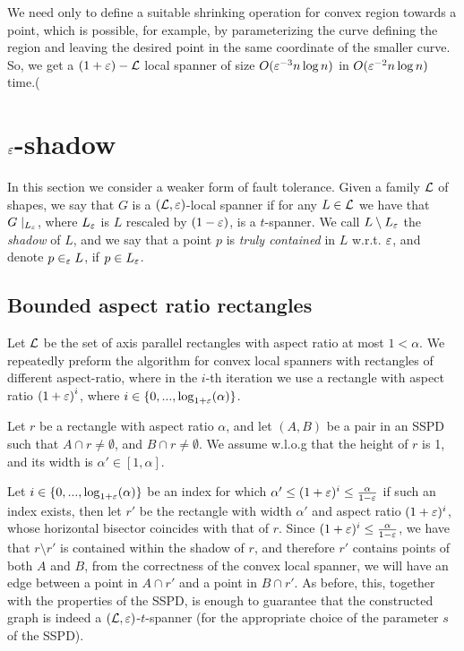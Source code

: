 \documentclass[12pt]{article}%
\begin{document}
We need only to define a suitable shrinking operation for convex
region towards a point, which is possible, for example, by
parameterizing the curve defining the region and leaving the desired
point in the same coordinate of the smaller curve. So, we get a
$(1+\varepsilon)-\mathcal{L}$ local spanner of size $O(\varepsilon^{-3}n\log n)$ in
$O(\varepsilon^{-2}n\log n)$ time.(



	\section{$\varepsilon$-shadow}

In this section we consider a weaker form of fault tolerance. Given a family $\mathcal{L}$ of shapes, we say that $G$ is a $(\mathcal{L},\varepsilon)$-local spanner if for any $L\in\mathcal{L}$ we have that $G\mid_{L_{\varepsilon}}$, where $L_{\varepsilon}$ is $L$ rescaled by $(1-\varepsilon)$, is a $t$-spanner. We call $L\setminus L_{\varepsilon}$ the \emph{shadow} of $L$, and we say that a point $p$ is \emph{truly contained} in $L$ w.r.t. $\varepsilon$, and denote $p\in_{\varepsilon} L$, if $p\in L_{\varepsilon}$. 

\subsection{Bounded aspect ratio rectangles}
Let $\mathcal{L}$ be the set of axis parallel rectangles with aspect ratio at most $1<\alpha$. We repeatedly preform the algorithm for convex local spanners with rectangles of different aspect-ratio, where in the $i$-th iteration we use a rectangle with aspect ratio $\left(1+\varepsilon\right)^i$, where $i\in\{0,...,\log_{1+\varepsilon}(\alpha)\}$. 

Let $r$ be a rectangle with aspect ratio $\alpha$, and let $(A,B)$ be a pair in an SSPD such that $A\cap r\neq \emptyset$, and $B\cap r\neq \emptyset$. We assume w.l.o.g that the height of $r$ is 1, and its width is $\alpha'\in [1,\alpha]$.

Let $i\in \{0,...,\log_{1+\varepsilon}(\alpha)\}$ be an index for which $\alpha' \leq (1+\varepsilon)^i \leq \frac{\alpha}{1-\varepsilon}$ if such an index exists, then let $r'$ be the rectangle with width $\alpha'$ and aspect ratio $(1+\varepsilon)^i$, whose horizontal bisector coincides with that of $r$. Since $(1+\varepsilon)^i \leq \frac{\alpha}{1-\varepsilon}$, we have that $r\setminus r'$ is contained within the shadow of $r$, and therefore $r'$ contains points of both $A$ and $B$, from the correctness of the convex local spanner, we will have an edge between a point in $A\cap r'$ and a point in $B\cap r'$. As before, this, together with the properties of the SSPD, is enough to guarantee that the constructed graph is indeed a $(\mathcal{L}, \varepsilon)$-$t$-spanner (for the appropriate choice of the parameter $s$ of the SSPD).
\end{document}
